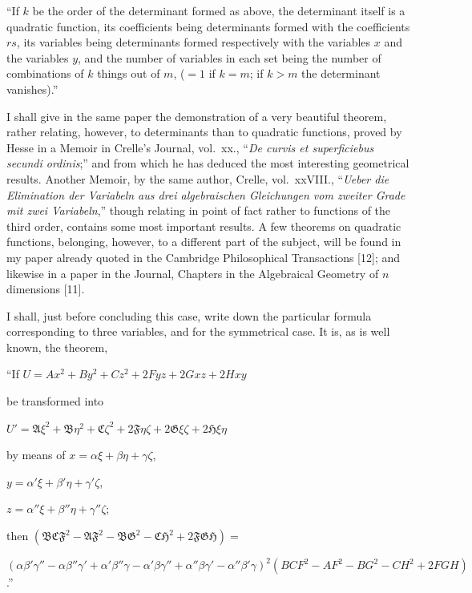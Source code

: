 \documentclass[11pt,a4paper]{book}
\begin{document}
``If $k$ be the order of the determinant formed as above, the determinant itself
is a quadratic function, its coefficients being determinants formed with the coefficients
$rs$, its variables being determinants formed respectively with the variables $x$ and the
variables $y$, and the number of variables in each set being the number of combinations
of $k$ things out of $m$, ($=1$ if $k=m$; if $k>m$ the determinant vanishes).''

I shall give in the same paper the demonstration of a very beautiful theorem,
rather relating, however, to determinants than to quadratic functions, proved by Hesse
in a Memoir in Crelle's Journal, vol.~xx., ``\textit{De curvis et superficiebus secundi ordinis};''
and from which he has deduced the most interesting geometrical results. Another
Memoir, by the same author, Crelle, vol.~xxVIII., ``\textit{Ueber die Elimination der Variabeln
aus drei algebraischen Gleichungen vom zweiter Grade mit zwei Variabeln},'' though
relating in point of fact rather to functions of the third order, contains some most
important results. A few theorems on quadratic functions, belonging, however, to a
different part of the subject, will be found in my paper already quoted in the Cambridge
Philosophical Transactions [12]; and likewise in a paper in the Journal, Chapters in
the Algebraical Geometry of $n$ dimensions [11].

I shall, just before concluding this case, write down the particular formula corresponding
to three variables, and for the symmetrical case. It is, as is well known, the
theorem,

``If $U = Ax^2 + By^2 + Cz^2 + 2Fyz + 2Gxz + 2Hxy$

be transformed into

$U' = \mathfrak{A}\xi^2 + \mathfrak{B}\eta^2 + \mathfrak{C}\zeta^2 + 2\mathfrak{F}\eta\zeta + 2\mathfrak{G}\xi\zeta + 2\mathfrak{H}\xi\eta$

by means of $x = \alpha\xi + \beta\eta + \gamma\zeta$,

$y = \alpha'\xi + \beta'\eta + \gamma'\zeta$,

$z = \alpha''\xi + \beta''\eta + \gamma''\zeta$;

then $(\mathfrak{B}\mathfrak{C}\mathfrak{F}^2 - \mathfrak{A}\mathfrak{F}^2 - \mathfrak{B}\mathfrak{G}^2 - \mathfrak{C}\mathfrak{H}^2 + 2\mathfrak{F}\mathfrak{G}\mathfrak{H}) =$

$(\alpha\beta'\gamma'' - \alpha\beta''\gamma' + \alpha'\beta''\gamma - \alpha'\beta\gamma'' + \alpha''\beta\gamma' - \alpha''\beta'\gamma)^2
(BCF^2 - AF^2 - BG^2 - CH^2 + 2FGH)$.''
\end{document}
